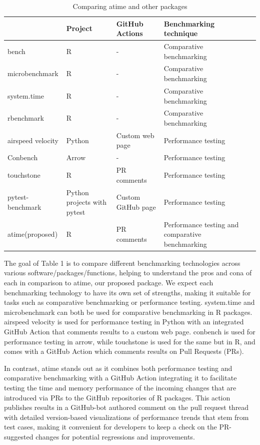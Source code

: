 \begin{table}[H]
    \centering
        \caption{Comparing atime and other packages}
    \begin{tabular}{|m{2.6cm}|m{2cm}|m{3cm}|m{3cm}|m{4cm}|}
    \hline
         & Project & GitHub Actions & Benchmarking technique\\
\hline
bench & R  & - &  Comparative benchmarking \\

\hline
microbenchmark & R & - & Comparative benchmarking\\
\hline
system.time & R & - & Comparative benchmarking\\
\hline
rbenchmark & R & - & Comparative benchmarking\\
\hline
airspeed velocity & Python & Custom web page & Performance testing\\
\hline
Conbench & Arrow  & - & Performance testing\\
\hline
touchstone & R & PR comments & Performance testing\\
\hline
pytest-benchmark & Python
projects with
pytest & Custom GitHub page & Performance testing\\
\hline
atime(proposed) & R & PR comments & Performance testing and comparative benchmarking\\
\hline
    \end{tabular}
    \label{tab:my_label}
\end{table}

\noindent The goal of Table 1 is to compare different benchmarking technologies across various software/packages/functions, helping to understand the pros and cona of each in comparison to atime, our proposed package. We expect each benchmarking technology to have its own set of strengths, making it suitable for tasks such as comparative benchmarking or performance testing. system.time and microbenchmark can both be used for comparative benchmarking in R packages. airspeed velocity is used for performance testing in Python with an integrated GitHub Action that comments results to a custom web page. conbench is used for performance testing in arrow, while touchstone is used for the same but in R, and comes with a GitHub Action which comments results on Pull Requests (PRs).

In contrast, atime stands out as it combines both performance testing and comparative benchmarking with a GitHub Action integrating it to facilitate testing the time and memory performance of the incoming changes that are introduced via PRs to the GitHub repositories of R packages. This action publishes results in a GitHub-bot authored comment on the pull request thread with detailed version-based visualizations of performance trends that stem from test cases, making it convenient for developers to keep a check on the PR-suggested changes for potential regressions and improvements.\\

